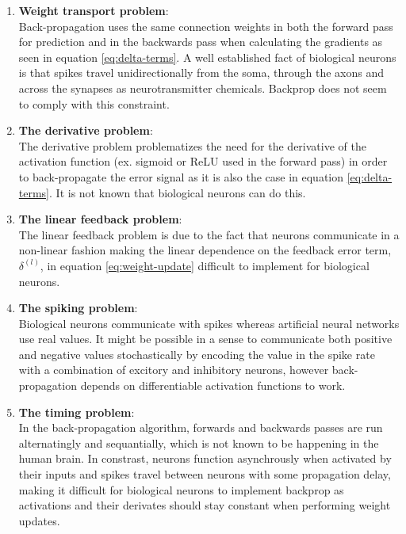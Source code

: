 \documentclass[a4paper,11pt]{article} %
\begin{document}
\begin{enumerate}
  \item \textbf{Weight transport problem}: \vspace{5pt} \\
  Back-propagation uses the same connection weights in both the forward pass for prediction and in the backwards pass when calculating the gradients as seen in equation \ref{eq:delta-terms}. A well established fact of biological neurons is that spikes travel unidirectionally from the soma, through the axons and across the synapses as neurotransmitter chemicals. Backprop does not seem to comply with this constraint. 
  \item \textbf{The derivative problem}: \vspace{5pt} \\
  The derivative problem problematizes the need for the derivative of the activation function (ex. sigmoid or ReLU used in the forward pass) in order to back-propagate the error signal as it is also the case in equation \ref{eq:delta-terms}. It is not known that biological neurons can do this.
  \item \textbf{The linear feedback problem}: \vspace{5pt} \\
  The linear feedback problem is due to the fact that neurons communicate in a non-linear fashion making the linear dependence on the feedback error term, $\delta^{(l)}$, in equation \ref{eq:weight-update} difficult to implement for biological neurons. 
  \item \textbf{The spiking problem}: \vspace{5pt} \\
  Biological neurons communicate with spikes whereas artificial neural networks use real values. It might be possible in a sense to communicate both positive and negative values stochastically by encoding the value in the spike rate with a combination of excitory and inhibitory neurons, however back-propagation depends on differentiable activation functions to work. %
  \item \textbf{The timing problem}: \vspace{5pt} \\
  In the back-propagation algorithm, forwards and backwards passes are run alternatingly and sequantially, which is not known to be happening in the human brain. In constrast, neurons function asynchrously when activated by their inputs and spikes travel between neurons with some propagation delay, making it difficult for biological neurons to implement backprop as activations and their derivates should stay constant when performing weight updates. 

\end{enumerate}
\end{document}
